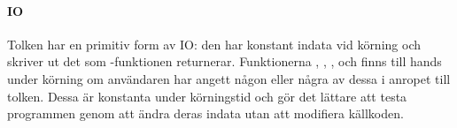 \documentclass[../Core]{subfiles}
\begin{document}
\paragraph{IO}
Tolken har en primitiv form av IO: den har konstant indata vid körning och
skriver ut det som -funktionen returnerar. Funktionerna 
, 
,
,
 och 
finns till hands under körning om användaren har angett någon eller några av
dessa i anropet till tolken. Dessa är konstanta under körningstid och gör det
lättare att testa programmen genom att ändra deras indata utan att modifiera
källkoden.
\end{document}
